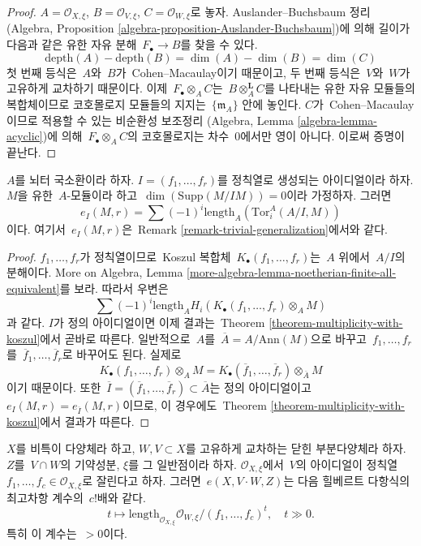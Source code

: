 \begin{proof}
$A = \mathcal{O}_{X, \xi}$, $B = \mathcal{O}_{V, \xi}$,
$C = \mathcal{O}_{W, \xi}$로 놓자. Auslander--Buchsbaum 정리
(Algebra, Proposition \ref{algebra-proposition-Auslander-Buchsbaum})에 의해
길이가 다음과 같은 유한 자유 분해\  $F_\bullet \to B$를 찾을 수 있다.
$$
\text{depth}(A) - \text{depth}(B) =
\dim(A) - \dim(B) = \dim(C)
$$
첫 번째 등식은\  $A$와\  $B$가\  Cohen--Macaulay이기 때문이고, 두 번째 등식은\ 
$V$와\  $W$가 고유하게 교차하기 때문이다. 이제\  $F_\bullet \otimes_A C$는\ 
$B \otimes_A^\mathbf{L} C$를 나타내는 유한 자유 모듈들의 복합체이므로
코호몰로지 모듈들의 지지는\  $\{\mathfrak m_A\}$ 안에 놓인다.
$C$가\  Cohen--Macaulay이므로 적용할 수 있는 비순환성 보조정리
(Algebra, Lemma \ref{algebra-lemma-acyclic})에 의해\ 
$F_\bullet \otimes_A C$의 코호몰로지는 차수\  $0$에서만 영이 아니다.
이로써 증명이 끝난다.
\end{proof}

\begin{lemma}
\label{lemma-one-ideal-ci}
$A$를 뇌터 국소환이라 하자. $I = (f_1, \ldots, f_r)$를 정칙열로 생성되는
아이디얼이라 하자. $M$을 유한\  $A$-모듈이라 하고\ 
$\dim(\text{Supp}(M/IM)) = 0$이라 가정하자. 그러면
$$
e_I(M, r) = \sum (-1)^i\text{length}_A(\text{Tor}_i^A(A/I, M))
$$
이다. 여기서\  $e_I(M, r)$은\  Remark \ref{remark-trivial-generalization}에서와
같다.
\end{lemma}

\begin{proof}
$f_1, \ldots, f_r$가 정칙열이므로\  Koszul 복합체\ 
$K_\bullet(f_1, \ldots, f_r)$는\  $A$ 위에서\  $A/I$의 분해이다.
More on Algebra, Lemma
\ref{more-algebra-lemma-noetherian-finite-all-equivalent}를 보라.
따라서 우변은
$$
\sum (-1)^i\text{length}_A H_i(K_\bullet(f_1, \ldots, f_r) \otimes_A M)
$$
과 같다. $I$가 정의 아이디얼이면 이제 결과는\ 
Theorem \ref{theorem-multiplicity-with-koszul}에서 곧바로 따른다.
일반적으로\  $A$를\  $\overline{A} = A/\text{Ann}(M)$으로 바꾸고\ 
$f_1, \ldots, f_r$를\  $\overline{f}_1, \ldots, \overline{f}_r$로 바꾸어도 된다.
실제로
$$
K_\bullet(f_1, \ldots, f_r) \otimes_A M =
K_\bullet(\overline{f}_1, \ldots, \overline{f}_r) \otimes_{\overline{A}} M
$$
이기 때문이다. 또한\ 
$\overline{I} = (\overline{f}_1, \ldots, \overline{f}_r) \subset \overline{A}$는
정의 아이디얼이고\  $e_I(M, r) = e_{\overline{I}}(M, r)$이므로, 이 경우에도\ 
Theorem \ref{theorem-multiplicity-with-koszul}에서 결과가 따른다.
\end{proof}

\begin{lemma}
\label{lemma-multiplicity-with-lci}
$X$를 비특이 다양체라 하고, $W,V \subset X$를 고유하게 교차하는 닫힌
부분다양체라 하자. $Z$를\  $V \cap W$의 기약성분, $\xi$를 그 일반점이라 하자.
$\mathcal{O}_{X, \xi}$에서\  $V$의 아이디얼이 정칙열\ 
$f_1, \ldots, f_c \in \mathcal{O}_{X, \xi}$로 잘린다고 하자.
그러면\  $e(X, V\cdot W, Z)$는 다음 힐베르트 다항식의 최고차항 계수의\ 
$c!$배와 같다.
$$
t \mapsto \text{length}_{\mathcal{O}_{X, \xi}}
\mathcal{O}_{W, \xi}/(f_1, \ldots, f_c)^t,\quad t \gg 0.
$$
특히 이 계수는\  $> 0$이다.
\end{lemma}

